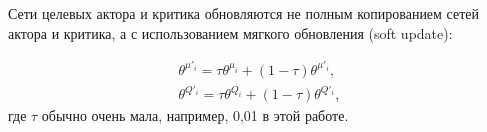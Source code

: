 Сети целевых актора и критика обновляются не полным копированием сетей актора и критика, а с использованием мягкого обновления (soft update):

\begin{equation}
    \begin{multlined}
        \theta^{\mu'_i} = \tau \theta^{\mu_i} + (1 - \tau)\theta^{\mu'_i},\\
        \theta^{Q'_i} = \tau \theta^{Q_i} + (1 - \tau)\theta^{Q'_i},
    \end{multlined}
\end{equation}
где $\tau$ обычно очень мала, например, 0,01 в этой работе.
